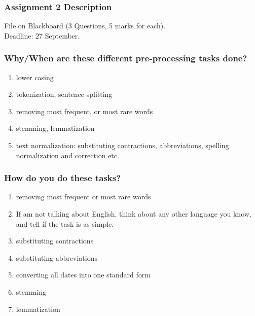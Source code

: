 \documentclass{beamer}
\begin{document}
\begin{frame}
\frametitle{Assignment 2 Description}
File on Blackboard (3 Questions, 5 marks for each). \\ Deadline: 27 September. 
\end{frame} %

\begin{frame}
\frametitle{Why/When are these different pre-processing tasks done?}
\begin{enumerate}
\item lower casing \pause
\item tokenization, sentence splitting \pause
\item removing most frequent, or most rare words \pause 
\item stemming, lemmatization \pause
\item text normalization: substituting contractions, abbreviations, spelling normalization and correction etc. \pause
\end{enumerate}
\end{frame}


\begin{frame}
\frametitle{How do you do these tasks?}
\begin{enumerate}
\item removing most frequent or most rare words \pause
\item If am not talking about English, think about any other language you know, and tell if the task is as simple. \pause
\item substituting contractions \pause
\item substituting abbreviations \pause
\item converting all dates into one standard form \pause
\item stemming \pause
\item lemmatization
\end{enumerate}
\end{frame}
\end{document}
